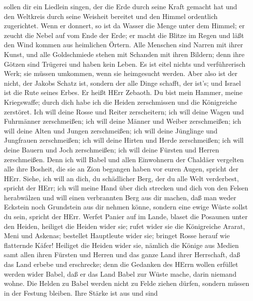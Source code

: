 sollen dir ein Liedlein singen,  der die Erde durch seine
Kraft gemacht hat und den Weltkreis durch seine Weisheit bereitet und
den Himmel ordentlich zugerichtet.  Wenn er donnert, so ist
da Wasser die Menge unter dem Himmel; er zeucht die Nebel auf vom Ende
der Erde; er macht die Blitze im Regen und läßt den Wind kommen aus
heimlichen Örtern.  Alle Menschen sind Narren mit ihrer
Kunst, und alle Goldschmiede stehen mit Schanden mit ihren Bildern; denn
ihre Götzen sind Trügerei und haben kein Leben.  Es ist
eitel nichts und verführerisch Werk; sie müssen umkommen, wenn sie
heimgesucht werden.  Aber also ist der nicht, der Jakobs
Schatz ist, sondern der alle Dinge schafft, der ist's; und Israel ist
die Rute seines Erbes. Er heißt HErr Zebaoth.  Du bist mein
Hammer, meine Kriegswaffe; durch dich habe ich die Heiden zerschmissen
und die Königreiche zerstöret.  Ich will deine Rosse und
Reiter zerscheitern; ich will deine Wagen und Fuhrmänner zerschmeißen;
 ich will deine Männer und Weiber zerschmeißen; ich will
deine Alten und Jungen zerschmeißen; ich will deine Jünglinge und
Jungfrauen zerschmeißen;  ich will deine Hirten und Herde
zerschmeißen; ich will deine Bauern und Joch zerschmeißen; ich will
deine Fürsten und Herren zerschmeißen.  Denn ich will Babel
und allen Einwohnern der Chaldäer vergelten alle ihre Bosheit, die sie
an Zion begangen haben vor euren Augen, spricht der HErr. 
Siehe, ich will an dich, du schädlicher Berg, der du alle Welt
verderbest, spricht der HErr; ich will meine Hand über dich strecken und
dich von den Felsen herabwälzen und will einen verbrannten Berg aus dir
machen,  daß man weder Eckstein noch Grundstein aus dir
nehmen könne, sondern eine ewige Wüste sollst du sein, spricht der HErr.
 Werfet Panier auf im Lande, blaset die Posaunen unter den
Heiden, heiliget die Heiden wider sie; rufet wider sie die Königreiche
Ararat, Meni und Askenas; bestellet Hauptleute wider sie; bringet Rosse
herauf wie flatternde Käfer!  Heiliget die Heiden wider
sie, nämlich die Könige aus Medien samt allen ihren Fürsten und Herren
und das ganze Land ihrer Herrschaft,  daß das Land erbebe
und erschrecke; denn die Gedanken des HErrn wollen erfüllet werden wider
Babel, daß er das Land Babel zur Wüste mache, darin niemand wohne.
 Die Helden zu Babel werden nicht zu Felde ziehen dürfen,
sondern müssen in der Festung bleiben. Ihre Stärke ist aus und sind

